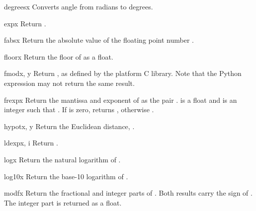 \begin{funcdesc}{degrees}{x}
Converts angle  from radians to degrees.
\end{funcdesc}

\begin{funcdesc}{exp}{x}
Return .
\end{funcdesc}

\begin{funcdesc}{fabs}{x}
Return the absolute value of the floating point number .
\end{funcdesc}

\begin{funcdesc}{floor}{x}
Return the floor of  as a float.
\end{funcdesc}

\begin{funcdesc}{fmod}{x, y}
Return , as defined by the platform C library.
Note that the Python expression  may not return
the same result.
\end{funcdesc}

\begin{funcdesc}{frexp}{x}
Return the mantissa and exponent of  as the pair
.   is a float and  is an
integer such that .
If  is zero, returns , otherwise
.
\end{funcdesc}

\begin{funcdesc}{hypot}{x, y}
Return the Euclidean distance, .
\end{funcdesc}

\begin{funcdesc}{ldexp}{x, i}
Return .
\end{funcdesc}

\begin{funcdesc}{log}{x}
Return the natural logarithm of .
\end{funcdesc}

\begin{funcdesc}{log10}{x}
Return the base-10 logarithm of .
\end{funcdesc}

\begin{funcdesc}{modf}{x}
Return the fractional and integer parts of .  Both results
carry the sign of .  The integer part is returned as a float.
\end{funcdesc}

